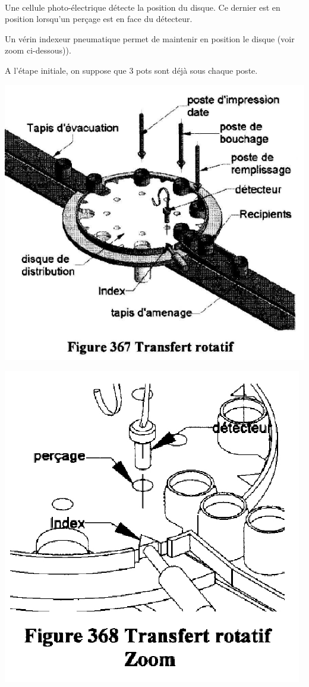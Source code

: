 ~\

Une cellule photo-électrique détecte la position du disque. Ce dernier est en position lorsqu'un perçage est en face du détecteur. 

Un vérin indexeur pneumatique permet de maintenir en position le disque (voir zoom ci-dessous)). 

A l'étape initiale, on suppose que 3 pots sont déjà sous chaque poste. 

\begin{minipage}{0.48\linewidth}
 \centering\includegraphics[width=0.7\linewidth]{img/Transfert2.png}
\end{minipage}
\hfill
\begin{minipage}{0.48\linewidth}
 \centering\includegraphics[width=0.7\linewidth]{img/Transfert3.png}
\end{minipage}


